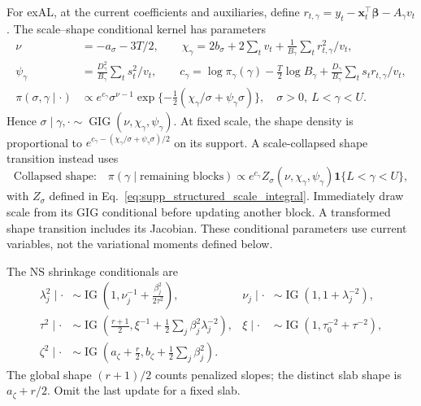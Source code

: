 \documentclass[12pt,letterpaper]{article}
\newcommand{\vect}[1]{\bm{#1}}
\newcommand{\ind}{\mathbf{1}}
\newcommand{\IG}{\operatorname{IG}}
\newcommand{\GIG}{\operatorname{GIG}}
\numberwithin{suppalgorithm}{section}
\numberwithin{equation}{section}
\numberwithin{table}{section}
\numberwithin{figure}{section}
\begin{document}
For exAL, at the current coefficients and auxiliaries, define
\(r_{t,\gamma}=y_t-\vect x_t^\top\vect\beta-A_\gamma v_t\). The
scale--shape conditional kernel has parameters
\begin{equation}
\begin{aligned}
\nu&=-a_\sigma-3T/2,\qquad
\chi_\gamma=2b_\sigma+2\sum_t v_t+
 \frac1{B_\gamma}\sum_t r_{t,\gamma}^2/v_t,\\
\psi_\gamma&=\frac{D_\gamma^2}{B_\gamma}\sum_t s_t^2/v_t,\qquad
c_\gamma=\log\pi_\gamma(\gamma)-\tfrac T2\log B_\gamma
 +\frac{D_\gamma}{B_\gamma}\sum_t s_tr_{t,\gamma}/v_t,\\
\pi(\sigma,\gamma\mid\cdot)&\propto
 e^{c_\gamma}\sigma^{\nu-1}
 \exp\{-\tfrac12(\chi_\gamma/\sigma+\psi_\gamma\sigma)\},
 \quad\sigma>0,\ L<\gamma<U.
\end{aligned}
\label{eq:supp_sigmagam_joint_kernel}
\end{equation}
Hence \(\sigma\mid\gamma,\cdot\sim\GIG(\nu,\chi_\gamma,\psi_\gamma)\).
At fixed scale, the shape density is proportional to
\(e^{c_\gamma-(\chi_\gamma/\sigma+\psi_\gamma\sigma)/2}\) on its
support. A scale-collapsed shape transition instead uses
\begin{equation}
\text{Collapsed shape:}\quad
\pi(\gamma\mid\text{remaining blocks})\propto
 e^{c_\gamma}Z_\sigma(\nu,\chi_\gamma,\psi_\gamma)\ind\{L<\gamma<U\},
\label{eq:supp_collapsed_shape_kernel}
\end{equation}
with \(Z_\sigma\) defined in Eq.~\eqref{eq:supp_structured_scale_integral}.
Immediately draw scale from its GIG conditional before updating another
block. A transformed shape transition includes its Jacobian. These
conditional parameters use current variables, not the variational moments
defined below.

The NS shrinkage conditionals are
\begin{equation}
\begin{aligned}
\lambda_j^2\mid\cdot&\sim\IG\!\left(1,\nu_j^{-1}
 +\frac{\beta_j^2}{2\tau^2}\right),&
\nu_j\mid\cdot&\sim\IG(1,1+\lambda_j^{-2}),\\
\tau^2\mid\cdot&\sim\IG\!\left(\frac{r+1}{2},\xi^{-1}
 +\frac12\sum_j\beta_j^2\lambda_j^{-2}\right),&
\xi\mid\cdot&\sim\IG(1,\tau_0^{-2}+\tau^{-2}),\\
\zeta^2\mid\cdot&\sim\IG\!\left(a_\zeta+\frac r2,
 b_\zeta+\frac12\sum_j\beta_j^2\right).
\end{aligned}
\label{eq:supp_rhs_mcmc}
\end{equation}
The global shape \((r+1)/2\) counts penalized slopes; the distinct slab
shape is \(a_\zeta+r/2\). Omit the last update for a fixed slab.
\end{document}

